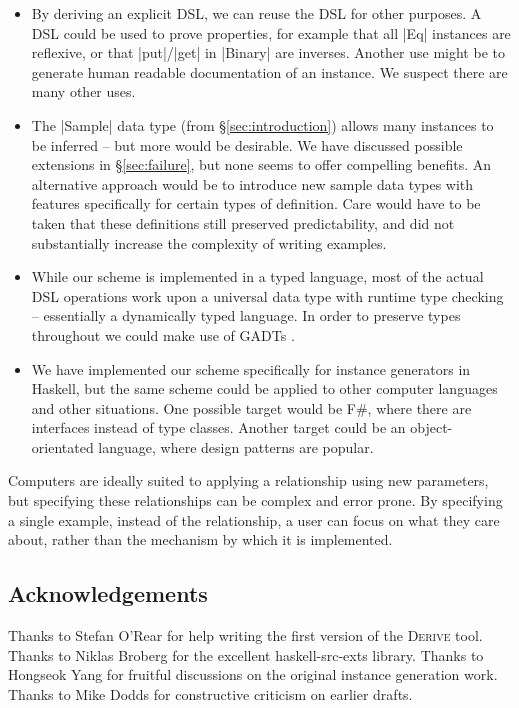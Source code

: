 \documentclass{llncs}
\newcommand{\derive}{\textsc{Derive}}
\begin{document}
\begin{itemize}
\item By deriving an explicit DSL, we can reuse the DSL for other purposes. A DSL could be used to prove properties, for example that all |Eq| instances are reflexive, or that |put|/|get| in |Binary| are inverses. Another use might be to generate human readable documentation of an instance. We suspect there are many other uses.
\item The |Sample| data type (from \S\ref{sec:introduction}) allows many instances to be inferred -- but more would be desirable. We have discussed possible extensions in \S\ref{sec:failure}, but none seems to offer compelling benefits. An alternative approach would be to introduce new sample data types with features specifically for certain types of definition. Care would have to be taken that these definitions still preserved predictability, and did not substantially increase the complexity of writing examples.
\item While our scheme is implemented in a typed language, most of the actual DSL operations work upon a universal data type with runtime type checking -- essentially a dynamically typed language. In order to preserve types throughout we could make use of GADTs \cite{spj:gadt}.
\item We have implemented our scheme specifically for instance generators in Haskell, but the same scheme could be applied to other computer languages and other situations. One possible target would be F\#, where there are interfaces instead of type classes. Another target could be an object-orientated language, where design patterns \cite{design_patterns} are popular.
\end{itemize}

Computers are ideally suited to applying a relationship using new parameters, but specifying these relationships can be complex and error prone. By specifying a single example, instead of the relationship, a user can focus on what they care about, rather than the mechanism by which it is implemented.

\subsection*{Acknowledgements}

Thanks to Stefan O'Rear for help writing the first version of the \derive{} tool. Thanks to Niklas Broberg for the excellent haskell-src-exts library. Thanks to Hongseok Yang for fruitful discussions on the original instance generation work. Thanks to Mike Dodds for constructive criticism on earlier drafts.
\end{document}

